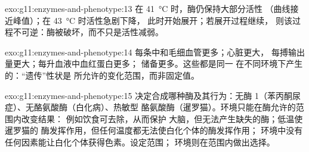 \begin{solution}{exo:g11:enzymes-and-phenotype:13}
在 \qty{41}{\celsius} 时，酶仍保持大部分活性
（曲线接近峰值）；在 \qty{43}{\celsius} 时活性急剧下降，
此时开始展开；若展开过程继续，
则该过程不可逆：酶被破坏，而不只是活性减弱。
\end{solution}

\begin{solution}{exo:g11:enzymes-and-phenotype:14}
每条中和毛细血管更多；心脏更大，
每搏输出量更大；每升血液中血红蛋白更多；
储备更多。这些都是同一
在不同环境下产生的：“遗传”性状是
所允许的变化范围，而非固定值。
\end{solution}

\begin{solution}{exo:g11:enzymes-and-phenotype:15}
决定合成哪种酶及其行为：无酶
1（苯丙酮尿症）、无酪氨酸酶（白化病）、热敏型
酪氨酸酶（暹罗猫）。环境只能在酶允许的范围内改变结果：
例如饮食可去除，从而保护
大脑，但无法产生缺失的酶；低温使暹罗猫的
酶发挥作用，但任何温度都无法使白化个体的酶发挥作用；
环境中没有任何因素能让白化个体获得色素。设定范围；
环境则在范围内做出选择。
\end{solution}

